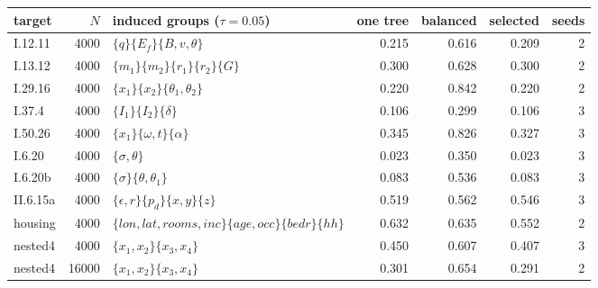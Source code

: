 \begin{tabular}{@{}lrlrrrr@{}}\toprule
target & $N$ & induced groups ($\tau=0.05$) & one tree & balanced & selected & seeds\\\midrule
I.12.11 & 4000 & $\{q\} \{E_f\} \{B,v,\theta\}$ & 0.215 & 0.616 & 0.209 & 2\\
I.13.12 & 4000 & $\{m_1\} \{m_2\} \{r_1\} \{r_2\} \{G\}$ & 0.300 & 0.628 & 0.300 & 2\\
I.29.16 & 4000 & $\{x_1\} \{x_2\} \{\theta_1,\theta_2\}$ & 0.220 & 0.842 & 0.220 & 2\\
I.37.4 & 4000 & $\{I_1\} \{I_2\} \{\delta\}$ & 0.106 & 0.299 & 0.106 & 3\\
I.50.26 & 4000 & $\{x_1\} \{\omega,t\} \{\alpha\}$ & 0.345 & 0.826 & 0.327 & 3\\
I.6.20 & 4000 & $\{\sigma,\theta\}$ & 0.023 & 0.350 & 0.023 & 3\\
I.6.20b & 4000 & $\{\sigma\} \{\theta,\theta_1\}$ & 0.083 & 0.536 & 0.083 & 3\\
II.6.15a & 4000 & $\{\epsilon,r\} \{p_d\} \{x,y\} \{z\}$ & 0.519 & 0.562 & 0.546 & 3\\
housing & 4000 & $\{lon,lat,rooms,inc\} \{age,occ\} \{bedr\} \{hh\}$ & 0.632 & 0.635 & 0.552 & 2\\
nested4 & 4000 & $\{x_1,x_2\} \{x_3,x_4\}$ & 0.450 & 0.607 & 0.407 & 3\\
nested4 & 16000 & $\{x_1,x_2\} \{x_3,x_4\}$ & 0.301 & 0.654 & 0.291 & 2\\
\bottomrule\end{tabular}